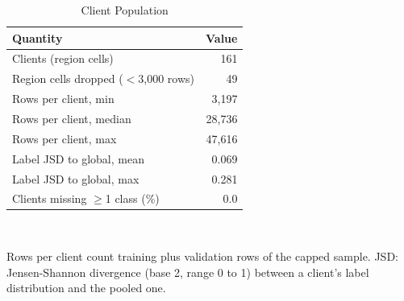 \begin{table}[t]
\centering
\footnotesize
\caption{Client Population}
\label{tab:clients}
\setlength{\tabcolsep}{4pt}
\begin{tabular}{lr}
\toprule
Quantity & Value \\
\midrule
Clients (region cells) & 161 \\
Region cells dropped ($<$3{,}000 rows) & 49 \\
Rows per client, min & 3{,}197 \\
Rows per client, median & 28{,}736 \\
Rows per client, max & 47{,}616 \\
Label JSD to global, mean & 0.069 \\
Label JSD to global, max & 0.281 \\
Clients missing $\geq$1 class (\%) & 0.0 \\
\bottomrule
\end{tabular}
\\[2pt]
\parbox{\linewidth}{\scriptsize Rows per client count training plus validation rows of the capped sample. JSD: Jensen-Shannon divergence (base 2, range 0 to 1) between a client's label distribution and the pooled one.}
\end{table}
